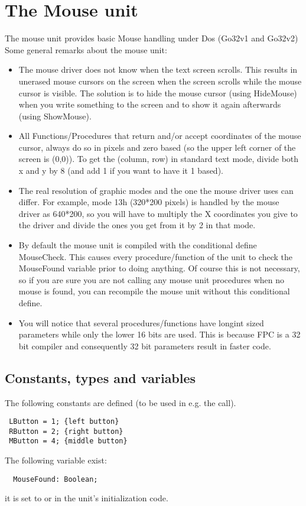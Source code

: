 \chapter{The Mouse unit}
The mouse unit provides basic Mouse handling under Dos (Go32v1 and Go32v2)
Some general remarks about the mouse unit:
\begin{itemize}
\item The mouse driver does not know when the text screen scrolls. This results
in unerased mouse cursors on the screen when the screen scrolls while the
mouse cursor is visible. The solution is to hide the mouse cursor (using
HideMouse) when you write something to the screen and to show it again
afterwards (using ShowMouse).
\item All Functions/Procedures that return and/or accept coordinates of the mouse
cursor, always do so in pixels and zero based (so the upper left corner of
the screen is (0,0)). To get the (column, row) in standard text mode, divide
both x and y by 8 (and add 1 if you want to have it 1 based).
\item The real resolution of graphic modes and the one the mouse driver uses can
differ. For example, mode 13h (320*200 pixels) is handled by the mouse driver
as 640*200, so you will have to multiply the X coordinates you give to the
driver and divide the ones you get from it by 2 in that mode.
\item By default the mouse unit is compiled with the conditional define
MouseCheck. This causes every procedure/function of the unit to check the
MouseFound variable prior to doing anything. Of course this is not necessary,
so if you are sure you are not calling any mouse unit procedures when no
mouse is found, you can recompile the mouse unit without this conditional
define.
\item
You will notice that several procedures/functions have longint sized
parameters while only the lower 16 bits are used. This is because FPC is
a 32 bit compiler and consequently 32 bit parameters result in faster code.
\end{itemize}
\section{Constants, types and variables}
The following constants are defined (to be used in e.g. the
 call).
\begin{verbatim}
 LButton = 1; {left button}
 RButton = 2; {right button}
 MButton = 4; {middle button}
\end{verbatim}
The following variable exist: 
\begin{verbatim}
  MouseFound: Boolean;
\end{verbatim}
it is set to  or  in the unit's initialization code.

